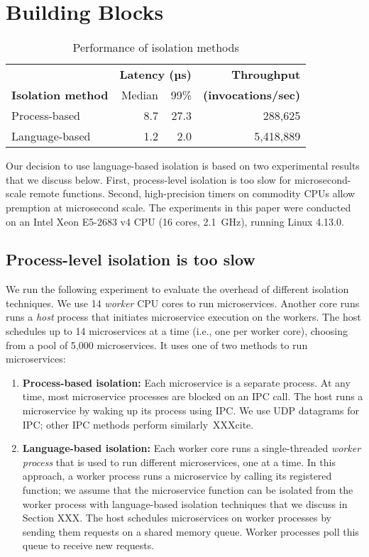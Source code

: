 \section{Building Blocks}
\label{sec:motive}

\begin{table}
\begin{center}
\small
\begin{tabular}{lrrr}
   & \multicolumn{2}{c}{\textbf{Latency (µs)}} & \textbf{Throughput} \\
  \textbf{Isolation method} & Median & 99\% & \textbf{(invocations/sec)} \\
\midrule
Process-based & 8.7 & 27.3 & 288,625 \\
Language-based & 1.2 & 2.0 & 5,418,889 \\
\end{tabular}
\caption{Performance of isolation methods}
\label{tab:isolation_methods}
\end{center}
\end{table}

Our decision to use language-based isolation is based on two experimental
results that we discuss below. First, process-level isolation is too slow for
microsecond-scale remote functions. Second, high-precision timers on commodity
CPUs allow premption at microsecond scale. The experiments in this paper were
conducted on an Intel Xeon E5-2683 v4 CPU (16 cores, 2.1~GHz), running
Linux 4.13.0.

\subsection{Process-level isolation is too slow}
We run the following experiment to evaluate the overhead of different isolation
techniques. We use 14 \emph{worker} CPU cores to run microservices. Another core runs
runs a \emph{host} process that initiates microservice execution on the workers.
The host schedules up to 14 microservices at a time (i.e., one
per worker core), choosing from a pool of 5,000 microservices. It uses one of two
methods to run microservices:

\begin{enumerate}
\item \textbf{Process-based isolation:} Each microservice is a separate process.
At any time, most microservice processes are blocked on an IPC
call. The host runs a microservice by waking up its process using IPC. We use
UDP datagrams for IPC; other IPC methods perform similarly~XXXcite.
\item \textbf{Language-based isolation:} Each worker core runs a single-threaded
\emph{worker process} that is used to run different microservices, one at a time.
In this approach, a worker process runs a microservice by calling its registered
function; we assume that the microservice function can be isolated from the
worker process with language-based isolation techniques that we discuss in
Section XXX. The host schedules microservices on worker processes by sending them
requests on a shared memory queue. Worker processes poll this queue to receive
new requests.
\end{enumerate}

